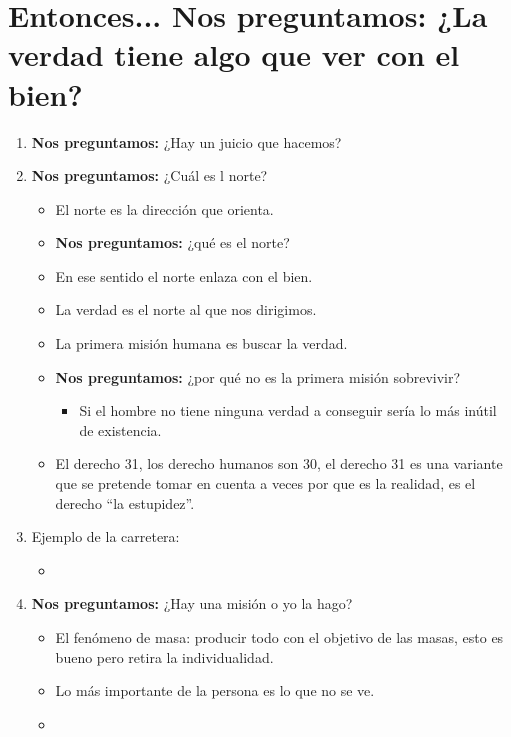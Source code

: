 \section{Entonces... \textbf{Nos preguntamos:} ¿La verdad tiene algo que ver con el bien?}
\begin{enumerate}
    \item \textbf{Nos preguntamos:} ¿Hay un juicio que hacemos?
    \item \textbf{Nos preguntamos:} ¿Cuál es l norte?
        \begin{itemize}
            \item El norte es la dirección que orienta.
            \item \textbf{Nos preguntamos:} ¿qué es el norte?
            \item En ese sentido el norte enlaza con el bien.
            \item La verdad es el norte al que nos dirigimos.
            \item La primera misión humana es buscar la verdad.
            \item \textbf{Nos preguntamos:} ¿por qué no es la primera misión sobrevivir?
                \begin{itemize}
                    \item Si el hombre no tiene ninguna verdad a conseguir sería lo más inútil de existencia.
                \end{itemize}
            
            \item El derecho 31, los derecho humanos son 30, el derecho 31 es una variante que se pretende tomar en cuenta a veces por que es la realidad, es el derecho ``la estupidez''.
        \end{itemize}

    \item Ejemplo de la carretera: 
        \begin{itemize}
            \item 
        \end{itemize}

    \item \textbf{Nos preguntamos:} ¿Hay una misión o yo la hago?
        \begin{itemize}
            \item El fenómeno de masa: producir todo con el objetivo de las masas, esto es bueno pero retira la individualidad.
            \item Lo más importante de la persona es lo que no se ve.
            \item 
        \end{itemize}
\end{enumerate}
 
